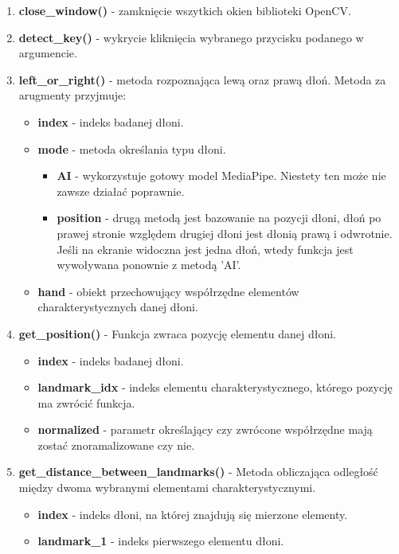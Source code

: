 \begin{enumerate}
    \item \textbf{close\_window()} - zamknięcie wszytkich okien biblioteki OpenCV.
    \item \textbf{detect\_key()} - wykrycie kliknięcia wybranego przycisku podanego w argumencie.
    \item \textbf{left\_or\_right()} - metoda rozpoznająca lewą oraz prawą dłoń. Metoda za arugmenty przyjmuje:
    \begin{itemize}
        \item \textbf{index} - indeks badanej dłoni. 
        \item \textbf{mode} - metoda określania typu dłoni. 
        \begin{itemize}
            \item \textbf{AI} - wykorzystuje gotowy model MediaPipe. Niestety ten może nie zawsze działać poprawnie. 
            \item \textbf{position} - drugą metodą jest bazowanie na pozycji dłoni, dłoń po prawej stronie względem drugiej dłoni jest dłonią prawą i odwrotnie. Jeśli na ekranie widoczna jest jedna dłoń, wtedy funkcja jest wywoływana ponownie z metodą 'AI'.
        \end{itemize}
        \item \textbf{hand} - obiekt przechowujący współrzędne elementów charakterystycznych danej dłoni. 
    \end{itemize}
    \item \textbf{get\_position()} - Funkcja zwraca pozycję elementu danej dłoni. 
    \begin{itemize}
        \item \textbf{index} - indeks badanej dłoni. 
        \item \textbf{landmark\_idx} - indeks elementu charakterystycznego, którego pozycję ma zwrócić funkcja. 
        \item \textbf{normalized} - parametr określający czy zwrócone współrzędne mają zostać znoramalizowane czy nie. 
    \end{itemize}
    \item \textbf{get\_distance\_between\_landmarks()} - Metoda obliczająca odległość między dwoma wybranymi elementami charakterystycznymi.
    \begin{itemize}
        \item \textbf{index} - indeks dłoni, na której znajdują się mierzone elementy. 
        \item \textbf{landmark\_1} - indeks pierwszego elementu dłoni. 

\end{itemize}
\end{enumerate}

